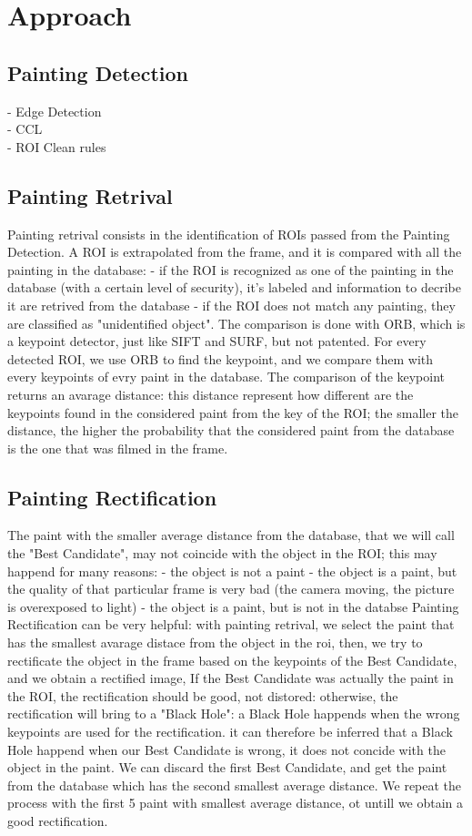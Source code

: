 \documentclass[10pt,twocolumn,letterpaper]{article}
\begin{document}
\section{Approach}

\subsection{Painting Detection}

- Edge Detection\\
- CCL\\
- ROI Clean rules

\subsection{Painting Retrival}
Painting retrival consists in the identification of ROIs passed from the Painting Detection. A ROI is extrapolated from the frame, and it is compared with all the painting in the database:
	- if the ROI is recognized as one of the painting in the database (with a certain level of security), it's labeled and information to decribe it are retrived from the database
	- if the ROI does not match any painting,  they are classified as "unidentified object".
The comparison is done with ORB, which is a keypoint detector, just like SIFT and SURF, but not patented.
For every detected ROI, we use ORB to find the keypoint, and we compare them with every keypoints of evry paint in the database.
The comparison of the keypoint returns an avarage distance: this distance represent how different are the keypoints found in the considered paint from the key of the ROI; the smaller the distance, the higher the probability that the considered paint from the database is the one that was filmed in the frame.

\subsection{Painting Rectification}
The paint with the smaller average distance from the database, that we will call the "Best Candidate", may not coincide with the object in the ROI; this may happend for many reasons:
	- the object is not a paint
	- the object is a paint, but the quality of that particular frame is very bad (the camera moving, the picture is overexposed to light)
	- the object is a paint, but is not in the databse
Painting Rectification can be very helpful: with painting retrival, we select the paint that has the smallest avarage distace from the object in the roi, then, we try to rectificate the object in the frame based on the keypoints of the Best Candidate, and we obtain a rectified image,
If the Best Candidate was actually the paint in the ROI, the rectification should be good, not distored: otherwise, the rectification will bring to a "Black Hole": a Black Hole happends when the wrong keypoints are used for the rectification.
it can therefore be inferred that a Black Hole happend when our Best Candidate is wrong, it does not concide with the object in the paint.
We can discard the first Best Candidate, and get the paint from the database which has the second smallest average distance.
We repeat the process with the first 5 paint with smallest average distance, ot untill we obtain a good rectification.
\end{document}
